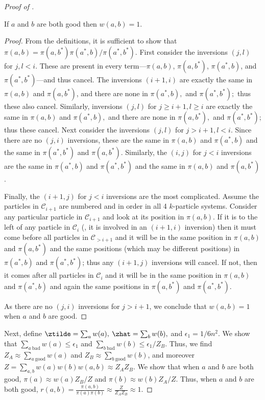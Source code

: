 \documentclass{toc}
\begin{document}
\begin{proof}[Proof of ]
\begin{lemma}\label{lem:good}
If $a$ and $b$ are both good then $w(a,b) = 1.$
\end{lemma}
\begin{proof}  
From the definitions, it is sufficient to show that $\pi(a,b) = 
\pi(a,b^*)\pi(a^*,b)/\pi(a^*,b^*).$ First consider the inversions 
$(j,l)$ for $j,l<i$.  These are present in every term---$\pi(a,b)$, 
$\pi(a,b^*)$, $\pi(a^*,b)$, and $\pi(a^*,b^*)$---and thus cancel. The 
inversions $(i+1,i)$ are exactly the same in $\pi(a,b)$ and 
$\pi(a,b^*)$, and there are none in $\pi(a^*,b),$ and $\pi(a^*,b^*);$ 
thus these also cancel.  Similarly, inversions $(j,l)$ for  $j\geq i+1,l 
\geq i$ are exactly the same in $\pi(a,b)$ and $\pi(a^*,b),$ and there 
are none in $\pi(a,b^*),$ and $\pi(a^*,b^*)$; thus these cancel. 
Next consider the inversions $(j,l)$ for  $j>i+1,l < i$.  Since there 
are no $(j,i)$ inversions, these are the same in $\pi(a,b)$ and 
$\pi(a^*,b)$ and the same in $\pi(a^*,b^*)$ and $\pi(a, b^*).$ 
Similarly, the $(i,j)$ for $j < i$ inversions are the same in 
$\pi(a^*,b)$ and $\pi(a^*,b^*)$ and the same in $\pi(a,b)$ and 
$\pi(a,b^*)$.  

Finally, the $(i+1,j)$ for $j<i$ inversions are the most complicated. 
Assume the particles in $\mathcal{C}_{i+1}$ are numbered and in order 
in all 4 $k$-particle systems.  Consider any particular particle in 
$\mathcal{C}_{i+1}$ and look at its position in $\pi(a,b)$.  If it is 
to the left of any particle in $\mathcal{C}_{i}$ (\ie,  it is involved 
in an $(i+1,i)$ inversion) then it must come before all particles in 
$\mathcal{C}_{> i+1}$ and it will be in the same position in $\pi(a,b)$ 
and $\pi(a,b^*)$ and the same positions (which may be different 
positions) in $\pi(a^*,b)$ and $\pi(a^*,b^*)$; thus any $(i+1,j)$ 
inversions will cancel.  If not, then it comes after all particles in 
$\mathcal{C}_{i}$ and it will be in the same position in $\pi(a,b)$ and 
$\pi(a^*,b)$ and again the same positions in $\pi(a,b^*)$ and 
$\pi(a^*,b^*)$.  

As there are no $(j,i)$ inversions for $j > i+1$, we conclude 
that $w(a,b) = 1$ when $a$ and $b$ are good. 
\end{proof}

Next, define $\ztilde =  \sum_{a} w(a),$  $\zhat =\sum_{b}w(b),$ and 
$\epsilon_1= 1/6n^2$. We show that $\sum_{a~\text{bad}}w(a)\leq 
\epsilon_1$ and $\sum_{b~\text{bad}}w(b)\leq \epsilon_1/Z_B$.  Thus, we 
find $Z_A\approx \sum_{a~\text{good}}  w(a)$ and $Z_B \approx 
\sum_{b~\text{good}}  w(b)$, and moreover 
$Z=\sum_{a,b}w(a)w(b)w(a,b)\approx Z_AZ_B.$ We show that when $a$ and 
$b$ are both good, $\pi(a)\approx w(a)Z_B/Z$ and $\pi(b)\approx 
w(b)Z_A/Z$.  Thus, when $a$ and $b$ are both good, $r(a,b) = 
\frac{\pi(a,b)}{\pi(a)\pi(b)} \approx \frac{Z}{Z_AZ_B}\approx 1.$


\end{proof}
\end{document}

